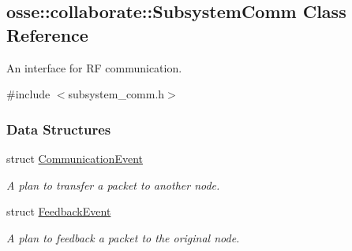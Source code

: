 \hypertarget{classosse_1_1collaborate_1_1_subsystem_comm}{}\subsection{osse\+:\+:collaborate\+:\+:Subsystem\+Comm Class Reference}
\label{classosse_1_1collaborate_1_1_subsystem_comm}


An interface for RF communication.  




{\ttfamily \#include $<$subsystem\+\_\+comm.\+h$>$}

\subsubsection*{Data Structures}
\begin{DoxyCompactItemize}
\item 
struct \hyperlink{structosse_1_1collaborate_1_1_subsystem_comm_1_1_communication_event}{Communication\+Event}
\begin{DoxyCompactList}\small\item\em A plan to transfer a packet to another node. \end{DoxyCompactList}\item 
struct \hyperlink{structosse_1_1collaborate_1_1_subsystem_comm_1_1_feedback_event}{Feedback\+Event}
\begin{DoxyCompactList}\small\item\em A plan to feedback a packet to the original node. \end{DoxyCompactList}\end{DoxyCompactItemize}
